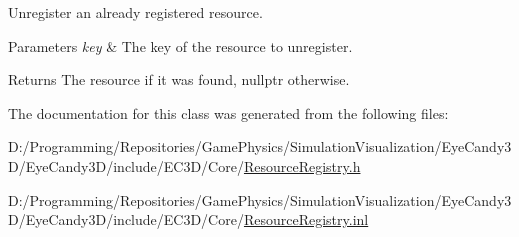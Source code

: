 Unregister an already registered resource. 


\begin{DoxyParams}{Parameters}
{\em key} & The key of the resource to unregister. \\
\hline
\end{DoxyParams}
\begin{DoxyReturn}{Returns}
The resource if it was found, nullptr otherwise. 
\end{DoxyReturn}


The documentation for this class was generated from the following files\+:\begin{DoxyCompactItemize}
\item 
D\+:/\+Programming/\+Repositories/\+Game\+Physics/\+Simulation\+Visualization/\+Eye\+Candy3\+D/\+Eye\+Candy3\+D/include/\+E\+C3\+D/\+Core/\mbox{\hyperlink{_resource_registry_8h}{Resource\+Registry.\+h}}\item 
D\+:/\+Programming/\+Repositories/\+Game\+Physics/\+Simulation\+Visualization/\+Eye\+Candy3\+D/\+Eye\+Candy3\+D/include/\+E\+C3\+D/\+Core/\mbox{\hyperlink{_resource_registry_8inl}{Resource\+Registry.\+inl}}\end{DoxyCompactItemize}
